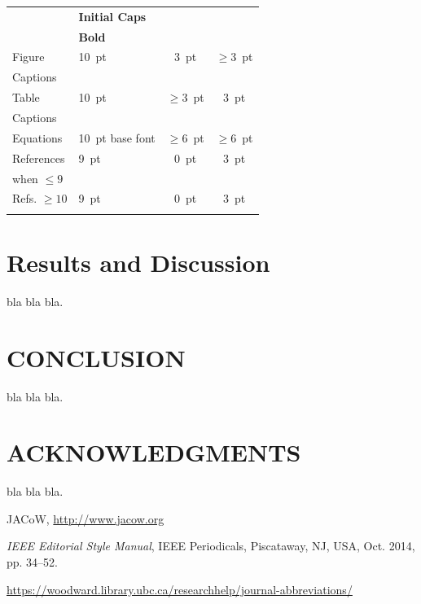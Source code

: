 \documentclass[letter,
               biblatex,     %
               keeplastbox,   %
               ]{jacow}
\begin{document}
\begin{table}[h!b]
\begin{tabular}{llcc}
                            & \textbf{Initial Caps}       &                 &      \\
		& \textbf{Bold}               &                 &      \\[5pt]
		Figure        & \SI{10}{pt}                 & \SI{3}{pt}      & $\ge$\SI{3}{pt}  \\
		Captions      &                             &                 &      \\[5pt]
		Table         & \SI{10}{pt}                 & $\ge$\SI{3}{pt} & \SI{3}{pt}  \\
		Captions	  &                             &                 &      \\[5pt]
		Equations     & \SI{10}{pt} base font       & $\ge$\SI{6}{pt}     & $\ge$\SI{6}{pt} \\[5pt]
		References      & \SI{9}{pt}				& \SI{0}{pt}      & \SI{3}{pt} \\
        when $\le9$ 	& \verb||	&                 &  \\[5pt]
        Refs. $\ge10$ 	& \SI{9}{pt}				& \SI{0}{pt}      & \SI{3}{pt}  \\
                		& \verb||	&    &    \\
		\bottomrule   %
	\end{tabular}
\end{table}

\section{Results and Discussion}

bla bla bla.


\section{CONCLUSION}

bla bla bla.

\section{ACKNOWLEDGMENTS}

bla bla bla.


%
%
%
	{\printbibliography}%
	{%
	
	\begin{thebibliography}{9} %
	
		JACoW,
		\url{http://www.jacow.org}
	
		\textit{IEEE Editorial Style Manual},
		IEEE Periodicals, Piscataway,
		NJ, USA, Oct. 2014, pp. 34--52.

	\url{https://woodward.library.ubc.ca/researchhelp/journal-abbreviations/}

	\end{thebibliography}
} %
\end{document}

